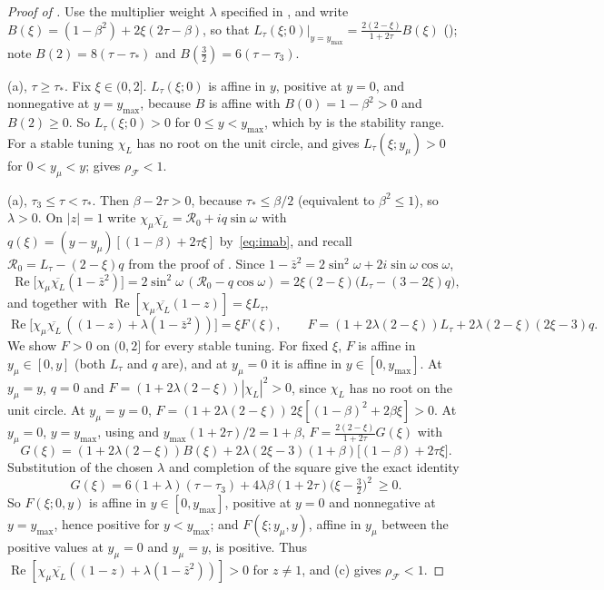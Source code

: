 \documentclass[11pt]{article}
\theoremstyle{definition}
\theoremstyle{remark}
\newcommand{\cF}{\mathcal F}
\newcommand{\Rea}{\operatorname{Re}}
\newcommand{\rhoF}{\rho_{\cF}}
\begin{document}
\begin{proof}[Proof of ]
Use the multiplier weight \(\lambda\) specified in , and write
\(B(\xi)=(1-\beta^2)+2\xi(2\tau-\beta)\), so that
\(L_\tau(\xi;0)|_{y=y_{\max}}=\frac{2(2-\xi)}{1+2\tau}B(\xi)\) (); note
\(B(2)=8(\tau-\tau_*)\) and \(B(\frac32)=6(\tau-\tau_3)\).

(a), \(\tau\ge\tau_*\).  Fix \(\xi\in(0,2]\).  \(L_\tau(\xi;0)\) is affine in \(y\), positive
at \(y=0\), and nonnegative at \(y=y_{\max}\), because \(B\) is affine with
\(B(0)=1-\beta^2>0\) and \(B(2)\ge0\).  So \(L_\tau(\xi;0)>0\) for \(0\le y<y_{\max}\), which by
 is the stability range.  For a stable tuning \(\chi_L\) has no
root on the unit circle, and  gives \(L_\tau(\xi;y_\mu)>0\) for
\(0<y_\mu<y\);  gives \(\rhoF<1\).

(a), \(\tau_3\le\tau<\tau_*\).  Then \(\beta-2\tau>0\), because \(\tau_*\le\beta/2\) (equivalent to \(\beta^2\le1\)), so
\(\lambda>0\).  On \(|z|=1\) write \(\chi_\mu\overline{\chi_L}=\mathcal R_0+iq\sin\omega\) with
\(q(\xi)=(y-y_\mu)[(1-\beta)+2\tau\xi]\) by~\eqref{eq:imab}, and recall \(\mathcal R_0=L_\tau-(2-\xi)q\) from
the proof of .  Since \(1-\bar z^2=2\sin^2\omega+2i\sin\omega\cos\omega\),
\[
\Rea\bigl[\chi_\mu\overline{\chi_L}(1-\bar z^2)\bigr]=2\sin^2\omega\,(\mathcal R_0-q\cos\omega)
=2\xi(2-\xi)\bigl(L_\tau-(3-2\xi)q\bigr),
\]
and together with \(\Rea[\chi_\mu\overline{\chi_L}(1-z)]=\xi L_\tau\),
\[
\Rea\bigl[\chi_\mu\overline{\chi_L}\,((1-z)+\lambda(1-\bar z^2))\bigr]=\xi F(\xi),\qquad
F=(1+2\lambda(2-\xi))L_\tau+2\lambda(2-\xi)(2\xi-3)q .
\]
We show \(F>0\) on \((0,2]\) for every stable tuning.  For fixed \(\xi\), \(F\) is affine in
\(y_\mu\in[0,y]\) (both \(L_\tau\) and \(q\) are), and at \(y_\mu=0\) it is affine in
\(y\in[0,y_{\max}]\).  At \(y_\mu=y\), \(q=0\) and \(F=(1+2\lambda(2-\xi))|\chi_L|^2>0\), since \(\chi_L\) has no
root on the unit circle.  At \(y_\mu=y=0\), \(F=(1+2\lambda(2-\xi))\,2\xi[(1-\beta)^2+2\beta\xi]>0\).  At
\(y_\mu=0\), \(y=y_{\max}\), using  and \(y_{\max}(1+2\tau)/2=1+\beta\),
\(F=\frac{2(2-\xi)}{1+2\tau}G(\xi)\) with
\[
G(\xi)=(1+2\lambda(2-\xi))B(\xi)+2\lambda(2\xi-3)(1+\beta)\bigl[(1-\beta)+2\tau\xi\bigr].
\]
Substitution of the chosen \(\lambda\) and completion of the square give the exact identity
\[
G(\xi)=6(1+\lambda)(\tau-\tau_3)
+4\lambda\beta(1+2\tau)\bigl(\xi-\tfrac32\bigr)^2\ \ge0 .
\]
So \(F(\xi;0,y)\) is affine in \(y\in[0,y_{\max}]\), positive at \(y=0\) and nonnegative at
\(y=y_{\max}\), hence positive for \(y<y_{\max}\); and \(F(\xi;y_\mu,y)\), affine in \(y_\mu\) between
the positive values at \(y_\mu=0\) and \(y_\mu=y\), is positive.  Thus
\(\Rea[\chi_\mu\overline{\chi_L}((1-z)+\lambda(1-\bar z^2))]>0\) for \(z\ne1\), and (c) gives
\(\rhoF<1\).


\end{proof}
\end{document}
